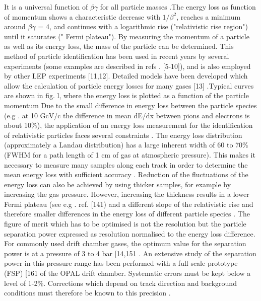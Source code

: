 It is a universal function of $\beta \gamma$ for all particle masses .The energy loss as function of momentum shows a characteristic decrease with $1/\beta^{2}$, reaches a minimum around $\beta \gamma$ = 4, and continues with a logarithmic rise ("relativistic rise region") until it saturates (" Fermi plateau"). By measuring the momentum of a particle as well as its energy loss, the mass of the particle can be determined.
This method of particle identification has been used in recent years by several experiments (some examples are described in refs . [5-10]), and is also employed by other LEP experiments [11,12]. Detailed models have been developed which allow the calculation of particle energy losses for many gases [13] .Typical curves are shown in fig. l, where the energy loss is plotted as a function of the particle momentum Due to the small difference in energy loss between the particle species (e.g . at 10 GcV/c the difference in mean dE/dx between pions and electrons is about 10$\%$), the application of an energy loss measurement for the identification of relativistic particles faces several constraints . The energy loss distribution (approximately a Landau distribution) has a large inherent width of 60 to 70$\%$ (FWHM for a path length of 1 cm of gas at atmospheric pressure). This makes it necessary to measure many samples along each track in
order to determine the mean energy loss with sufficient accuracy . Reduction of the fluctuations of the energy loss can also be achieved by using thicker samples, for example by increasing the gas pressure. However, increasing the thickness results in a lower Fermi plateau (see e.g . ref. [141) and a different slope of the relativistic rise and therefore smaller differences in the energy loss of different particle species . The figure of merit which has to be optimised is not the resolution but the particle separation power expressed as resolution normalised to the energy loss difference. For commonly used drift chamber gases, the optimum value for the separation power is at a pressure of 3 to 4 bar [14,151 . An extensive study of the separation power in this
pressure range has been performed with a full scale prototype (FSP) [161 of the OPAL drift chamber. Systematic errors must be kept below a level of 1-2$\%$. Corrections which depend on track direction and background conditions must therefore be known to this precision .

